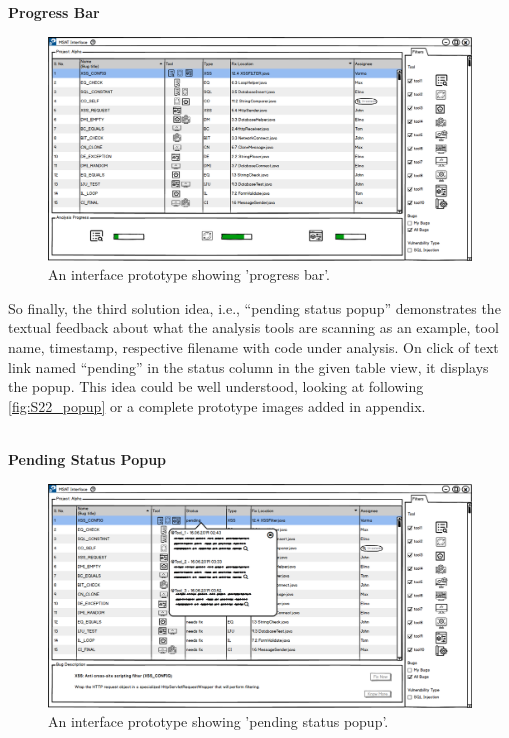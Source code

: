 \textbf{Progress Bar}
\begin{figure}[hbt!]
	\centering
	\includegraphics[width=\linewidth]{figures/solution_ideas_snaps/S22_progress}
	\caption{An interface prototype showing 'progress bar'.}
	\label{fig:S22_progress}
\end{figure}


So finally, the third solution idea, i.e., “pending status popup” demonstrates the textual feedback about what the analysis tools are scanning as an example, tool name, timestamp, respective filename with code under analysis. On click of text link named “pending” in the status column in the given table view, it displays the popup. This idea could be well understood, looking at following \autoref{fig:S22_popup} or a complete prototype images added in appendix. \\ \\

\clearpage

\textbf{Pending Status Popup}
\begin{figure}[hbt!]
	\centering
	\includegraphics[width=\linewidth]{figures/solution_ideas_snaps/S22_popup}
	\caption{An interface prototype showing 'pending status popup'.}
	\label{fig:S22_popup}
\end{figure}

